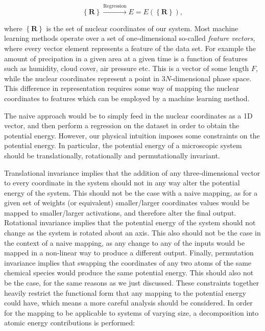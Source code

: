 $$ \left\{ \bm{R} \right\} \overset{\text{Regression}}{\longrightarrow}
    E = E\left( \left\{ \bm{R} \right\}\right) , $$

where $\left\{\bm{R}\right\}$ is the set of nuclear coordinates of our system.
Most machine learning methods operate over a set of one-dimensional
so-called \textit{feature vectors}, where every vector element
represents a feature of the data set. For example the amount
of precipation in a given area at a given time is a function
of features such as humidity, cloud cover, air pressure etc.
This is a vector of some length $F$, while the nuclear coordinates
represent a point in $3N$-dimensional phase space.
This difference in representation requires some way of mapping
the nuclear coordinates to features which can be employed
by a machine learning method.
\par
The naive approach would be to simply feed in the nuclear coordinates
as a 1D vector, and then perform a regression on the dataset
in order to obtain the potential energy. However, our physical intuition
imposes some constraints on the potential energy.
In particular, the potential energy of a microscopic system should
be translationally, rotationally and permutationally invariant.
\par
Translational invariance implies that the addition of any
three-dimensional vector to every coordinate in the system should
not in any way alter the potential energy of the system.
This should not be the case with a naive mapping, as for a given
set of weights (or equivalent) smaller/larger coordinates
values would be mapped to smaller/larger activations, and therefore
alter the final output.
Rotational invariance implies that the potential energy
of the system should not change as the system is rotated
about an axis. This also should not be the case in the context
of a naive mapping, as any change to any of the inputs
would be mapped in a non-linear way to produce a different output.
Finally, permutation invariance implies that swapping the coordinates
of any two atoms of the same chemical species would produce the
same potential energy. This should also not be the case, for
the same reasons as we just discussed.
These constraints together heavily restrict the functional form
that any mapping to the potential energy could have,
which means a more careful analysis should be considered.
\newline
\newline
In order for the mapping to be applicable to systems of varying size,
a decomposition into atomic energy contributions is performed:

